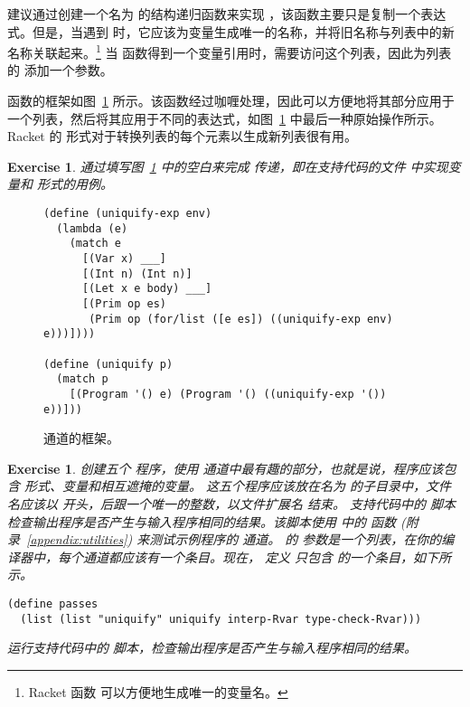 \documentclass[11pt]{book}
\newtheorem{exercise}[theorem]{Exercise}
\begin{document}
建议通过创建一个名为  的结构递归函数来实现  ，该函数主要只是复制一个表达式。但是，当遇到  时，它应该为变量生成唯一的名称，并将旧名称与列表中的新名称关联起来。\footnote{ Racket 函数
   可以方便地生成唯一的变量名。} 当
 函数得到一个变量引用时，需要访问这个列表，因此为列表的 添加一个参数。

  函数的框架如图~\ref{fig:uniquify-Rvar} 所示。该函数经过咖喱处理，因此可以方便地将其部分应用于一个列表，然后将其应用于不同的表达式，如图~\ref{fig:uniquify-Rvar} 中最后一种原始操作所示。Racket 的
%
\href{https://docs.racket-lang.org/reference/for.html#%28form._%28%28lib._racket%2Fprivate%2Fbase..rkt%29._for%2Flist%29%29}{\key{for/list}}
%
形式对于转换列表的每个元素以生成新列表很有用。

\begin{exercise}
\normalfont %

通过填写图~\ref{fig:uniquify-Rvar} 中的空白来完成  传递，即在支持代码的文件  中实现变量和  形式的用例。
\end{exercise}

\begin{figure}[tbp]
\begin{lstlisting}
(define (uniquify-exp env)
  (lambda (e)
    (match e
      [(Var x) ___]
      [(Int n) (Int n)]
      [(Let x e body) ___]
      [(Prim op es)
       (Prim op (for/list ([e es]) ((uniquify-exp env) e)))])))

(define (uniquify p)
  (match p
    [(Program '() e) (Program '() ((uniquify-exp '()) e))]))
\end{lstlisting}
\caption{  通道的框架。}
\label{fig:uniquify-Rvar}
\end{figure}

\begin{exercise}
\normalfont %

创建五个 \LangVar{} 程序，使用  通道中最有趣的部分，也就是说，程序应该包含
 形式、变量和相互遮掩的变量。
这五个程序应该放在名为 的子目录中，文件名应该以 
开头，后跟一个唯一的整数，以文件扩展名 结束。
%
支持代码中的  脚本检查输出程序是否产生与输入程序相同的结果。该脚本使用  中的  函数
(附录~\ref{appendix:utilities}) 来测试示例程序的  通道。   的 
参数是一个列表，在你的编译器中，每个通道都应该有一个条目。现在，  定义
只包含  的一个条目，如下所示。
\begin{lstlisting}
(define passes 
  (list (list "uniquify" uniquify interp-Rvar type-check-Rvar)))
\end{lstlisting}
运行支持代码中的  脚本，检查输出程序是否产生与输入程序相同的结果。
\end{exercise}
\end{document}
